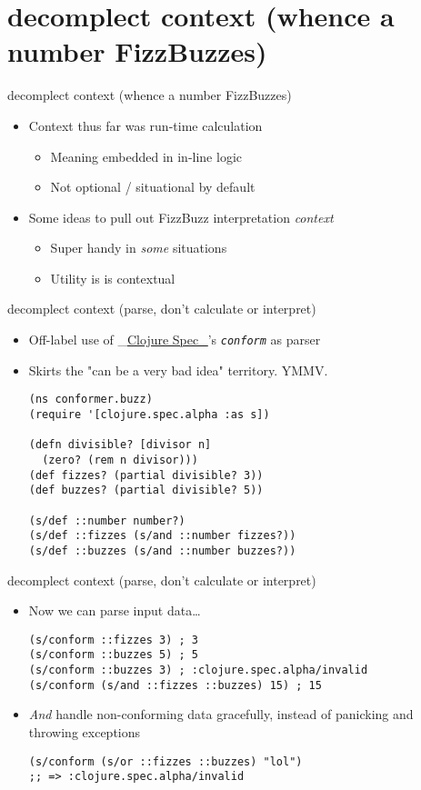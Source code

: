 \documentclass[presentation]{beamer}
\begin{document}
\section{decomplect context (whence a number FizzBuzzes)}
\label{sec:orgac0c86a}
\begin{frame}[label={sec:org0d6376c}]{decomplect context (whence a number FizzBuzzes)}
\begin{itemize}
\item Context thus far was run-time calculation
\begin{itemize}
\item Meaning embedded in in-line logic
\item Not optional / situational by default
\end{itemize}
\item Some ideas to pull out FizzBuzz interpretation \emph{context}
\begin{itemize}
\item Super handy in \emph{some} situations
\item Utility is is contextual
\end{itemize}
\end{itemize}
\end{frame}
\begin{frame}[label={sec:org73848a5},fragile]{decomplect context (parse, don't calculate or interpret)}
 \begin{itemize}
\item Off-label use of \_\href{https://clojure.org/guides/spec}{Clojure Spec\_}'s \emph{\texttt{conform}} as parser
\item Skirts the "can be a very bad idea" territory. YMMV.
\begin{verbatim}
(ns conformer.buzz)
(require '[clojure.spec.alpha :as s])

(defn divisible? [divisor n]
  (zero? (rem n divisor)))
(def fizzes? (partial divisible? 3))
(def buzzes? (partial divisible? 5))

(s/def ::number number?)
(s/def ::fizzes (s/and ::number fizzes?))
(s/def ::buzzes (s/and ::number buzzes?))
\end{verbatim}
\end{itemize}
\end{frame}
\begin{frame}[label={sec:orgbec344a},fragile]{decomplect context (parse, don't calculate or interpret)}
 \begin{itemize}
\item Now we can parse input data\ldots{}
\begin{verbatim}
(s/conform ::fizzes 3) ; 3
(s/conform ::buzzes 5) ; 5
(s/conform ::buzzes 3) ; :clojure.spec.alpha/invalid
(s/conform (s/and ::fizzes ::buzzes) 15) ; 15
\end{verbatim}
\item \emph{And} handle non-conforming data gracefully,
instead of panicking and throwing exceptions
\begin{verbatim}
(s/conform (s/or ::fizzes ::buzzes) "lol")
;; => :clojure.spec.alpha/invalid
\end{verbatim}
\end{itemize}
\end{frame}
\end{document}
